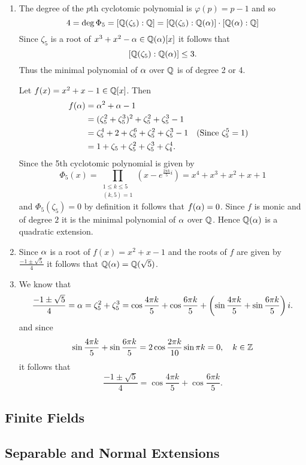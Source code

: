     \begin{enumerate}
        \item The degree of the $p$th cyclotomic polynomial is $\varphi(p)=p-1$ and so
            $$4=\deg\Phi_5=\left[\mathbb{Q}(\zeta_5):\mathbb{Q}\right]=\left[\mathbb{Q}(\zeta_5):\mathbb{Q}(\alpha)\right]\cdot\left[\mathbb{Q}(\alpha):\mathbb{Q}\right]$$
            Since $\zeta_5$ is a root of $x^3+x^2-\alpha\in\mathbb{Q}(\alpha)[x]$ it follows that 
            $$\left[\mathbb{Q}(\zeta_5):\mathbb{Q}(\alpha)\right]\leq 3.$$
            Thus the minimal polynomial of $\alpha$ over $\mathbb{Q}$ is of degree 2 or 4.

            Let $f(x)=x^2+x-1\in\mathbb{Q}[x]$. Then
            \begin{align*}
                f(\alpha)&=\alpha^2+\alpha-1\\
                &=(\zeta_5^2+\zeta_5^3)^2+\zeta_5^2+\zeta_5^3-1\\
                &=\zeta_5^4+2+\zeta_5^6+\zeta_5^2+\zeta_5^3-1&&(\text{Since }\zeta_5^5=1)\\
                &=1+\zeta_5+\zeta_5^2+\zeta_5^3+\zeta_4^4.
            \end{align*}
            Since the 5th cyclotomic polynomial is given by
            $$\Phi_5(x)=\prod_{\substack{1\leq k\leq 5\\(k,5)=1}}\left(x-e^{\frac{2\pi k}{5}i}\right)=x^4+x^3+x^2+x+1$$
            and $\Phi_5(\zeta_5)=0$ by definition it follows that $f(\alpha)=0$.
            Since $f$ is monic and of degree $2$ it is the minimal polynomial of $\alpha$ over $\mathbb{Q}$.
            Hence $\mathbb{Q}(\alpha)$ is a quadratic extension.
        \item Since $\alpha$ is a root of $f(x)=x^2+x-1$ and the roots of $f$ are given by $\frac{-1\pm\sqrt{5}}{4}$
            it follows that $\mathbb{Q}(\alpha)=\mathbb{Q}(\sqrt{5})$.
        \item We know that
            $$\frac{-1\pm\sqrt{5}}{4}=\alpha=\zeta_5^2+\zeta_5^3=\cos\frac{4\pi k}{5}+\cos\frac{6\pi k}{5}+\left(\sin\frac{4\pi k}{5}+\sin\frac{6\pi k}{5}\right)i.$$
            and since
            $$\sin\frac{4\pi k}{5}+\sin\frac{6\pi k}{5}=2\cos\frac{2\pi k}{10}\sin\pi k= 0,\quad k\in\mathbb{Z}$$
            it follows that
            $$\frac{-1\pm\sqrt{5}}{4}=\cos\frac{4\pi k}{5}+\cos\frac{6\pi k}{5}.$$
    \end{enumerate}
\subsection{Finite Fields}

\subsection{Separable and Normal Extensions}